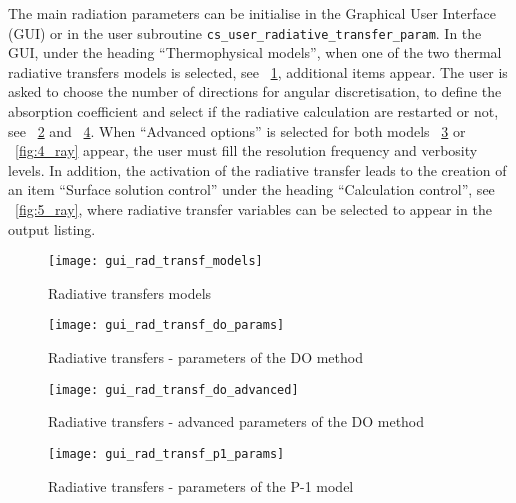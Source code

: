 {{{The main radiation parameters can be initialise in the Graphical User Interface (GUI) or in the user subroutine \texttt{cs\_user\_radiative\_transfer\_param}. In the GUI, under the heading ``Thermophysical models'', when one of the two thermal radiative transfers models is selected, see \figurename~\ref{fig:0_ray}, additional items appear. The user is asked to choose the number of directions for angular discretisation, to define the absorption coefficient and select if the radiative calculation are restarted or not,
see \figurename~\ref{fig:1_ray} and \figurename~\ref{fig:3_ray}. When ``Advanced options'' is selected for both models \figurename~\ref{fig:2_ray} or \figurename~\ref{fig:4_ray} appear, the user must fill the resolution frequency and verbosity levels. In addition, the activation of the radiative transfer leads to the creation of an item ``Surface solution control'' under the heading ``Calculation control'',
see \figurename~\ref{fig:5_ray}, where radiative transfer variables can be selected to appear in the output listing.

\begin{figure}[ht]
\begin{center}
\texttt{[image: gui\_rad\_transf\_models]}
\caption{Radiative transfers models}
\label{fig:0_ray}
\end{center}
\end{figure}

\begin{figure}[ht]
\begin{center}
\texttt{[image: gui\_rad\_transf\_do\_params]}
\caption{Radiative transfers - parameters of the DO method}
\label{fig:1_ray}
\end{center}
\end{figure}

\begin{figure}[ht]
\begin{center}
\texttt{[image: gui\_rad\_transf\_do\_advanced]}
\caption{Radiative transfers - advanced parameters of the DO method}
\label{fig:2_ray}
\end{center}
\end{figure}

\begin{figure}[ht]
\begin{center}
\texttt{[image: gui\_rad\_transf\_p1\_params]}
\caption{Radiative transfers - parameters of the P-1 model}
\label{fig:3_ray}
\end{center}
\end{figure}

}}}
